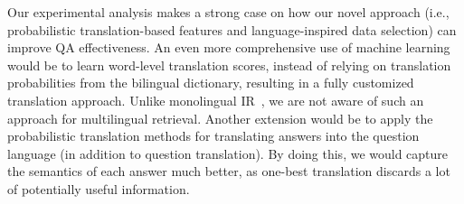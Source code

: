 \documentclass{sig-alternate-05-2015}
\begin{document}
Our experimental analysis makes a strong case on how our novel approach (i.e., probabilistic
translation-based features and language-inspired data selection) can improve QA effectiveness. 
An even more comprehensive use of machine learning would be to learn word-level translation scores, instead
of relying on translation probabilities from the bilingual dictionary, resulting in a fully customized translation
approach. Unlike monolingual IR~\cite{Bendersky:2010aa}, 
we are not aware of such an approach for multilingual retrieval. 
Another extension would be to apply the probabilistic translation methods for translating answers into
the question language (in addition to question translation). By doing this, we would capture the 
semantics of each answer much better, as one-best translation discards a lot of 
potentially useful information.



%



\end{document}
